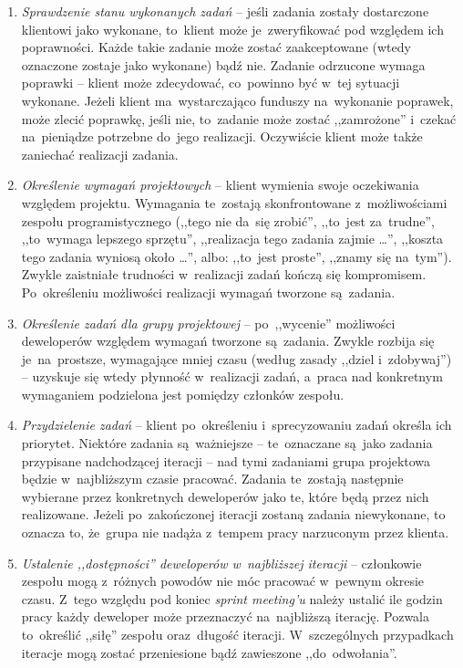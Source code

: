 \begin{enumerate}
  \item \textit{Sprawdzenie stanu wykonanych zadań} -- jeśli zadania zostały dostarczone klientowi jako wykonane, to~klient może je~zweryfikować pod względem ich poprawności. Każde takie zadanie może zostać zaakceptowane (wtedy oznaczone zostaje jako wykonane) bądź nie. Zadanie odrzucone wymaga poprawki -- klient może zdecydować, co~powinno być w~tej sytuacji wykonane. Jeżeli klient ma~wystarczająco funduszy na~wykonanie poprawek, może zlecić poprawkę, jeśli nie, to~zadanie może zostać ,,zamrożone'' i~czekać na~pieniądze potrzebne do~jego realizacji. Oczywiście klient może także zaniechać realizacji zadania.
  \item \textit{Określenie wymagań projektowych} -- klient wymienia swoje oczekiwania względem projektu. Wymagania te~zostają skonfrontowane z~możliwościami zespołu programistycznego (,,tego nie da~się zrobić'', ,,to~jest za~trudne'', ,,to~wymaga lepszego sprzętu'', ,,realizacja tego zadania zajmie \ldots'', ,,koszta tego zadania wyniosą około \ldots'', albo: ,,to~jest proste'', ,,znamy się na~tym''). Zwykle zaistniałe trudności w~realizacji zadań kończą się kompromisem. Po~określeniu możliwości realizacji wymagań tworzone są~zadania.
  \item \textit{Określenie zadań dla grupy projektowej} -- po~,,wycenie'' możliwości deweloperów względem wymagań tworzone są~zadania. Zwykle rozbija się je~na~prostsze, wymagające mniej czasu (według zasady ,,dziel i~zdobywaj'') -- uzyskuje się wtedy płynność w~realizacji zadań, a~praca nad konkretnym wymaganiem podzielona jest pomiędzy członków zespołu.
  \item \textit{Przydzielenie zadań} -- klient po~określeniu i~sprecyzowaniu zadań określa ich priorytet. Niektóre zadania są~ważniejsze -- te~oznaczane są~jako zadania przypisane nadchodzącej iteracji -- nad tymi zadaniami grupa projektowa będzie w~najbliższym czasie pracować. Zadania te~zostają następnie wybierane przez konkretnych deweloperów jako te, które będą przez nich realizowane. Jeżeli po~zakończonej iteracji zostaną zadania niewykonane, to oznacza to, że~grupa nie nadąża z~tempem pracy narzuconym przez klienta.
  \item \textit{Ustalenie ,,dostępności'' deweloperów w~najbliższej iteracji} -- członkowie zespołu mogą z~różnych powodów nie móc pracować w~pewnym okresie czasu. Z~tego względu pod koniec \textit{sprint meeting'u} należy ustalić ile godzin pracy każdy deweloper może przeznaczyć na~najbliższą iterację. Pozwala to~określić ,,siłę'' zespołu oraz~długość iteracji. W~szczególnych przypadkach iteracje mogą zostać przeniesione bądź zawieszone ,,do~odwołania''.
\end{enumerate}

